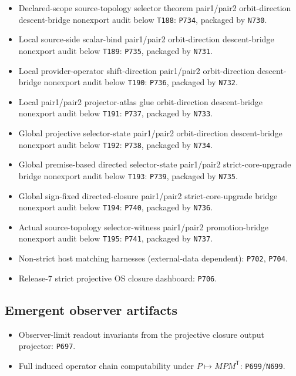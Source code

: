 \documentclass[11pt,a4paper]{article}
\begin{document}
\begin{itemize}
  \item Declared-scope source-topology selector theorem pair1/pair2 orbit-direction descent-bridge nonexport audit below \texttt{T188}: \texttt{P734}, packaged by \texttt{N730}.
  \item Local source-side scalar-bind pair1/pair2 orbit-direction descent-bridge nonexport audit below \texttt{T189}: \texttt{P735}, packaged by \texttt{N731}.
  \item Local provider-operator shift-direction pair1/pair2 orbit-direction descent-bridge nonexport audit below \texttt{T190}: \texttt{P736}, packaged by \texttt{N732}.
  \item Local pair1/pair2 projector-atlas glue orbit-direction descent-bridge nonexport audit below \texttt{T191}: \texttt{P737}, packaged by \texttt{N733}.
  \item Global projective selector-state pair1/pair2 orbit-direction descent-bridge nonexport audit below \texttt{T192}: \texttt{P738}, packaged by \texttt{N734}.
  \item Global premise-based directed selector-state pair1/pair2 strict-core-upgrade bridge nonexport audit below \texttt{T193}: \texttt{P739}, packaged by \texttt{N735}.
  \item Global sign-fixed directed-closure pair1/pair2 strict-core-upgrade bridge nonexport audit below \texttt{T194}: \texttt{P740}, packaged by \texttt{N736}.
  \item Actual source-topology selector-witness pair1/pair2 promotion-bridge nonexport audit below \texttt{T195}: \texttt{P741}, packaged by \texttt{N737}.
  \item Non-strict host matching harnesses (external-data dependent): \texttt{P702}, \texttt{P704}.
  \item Release-7 strict projective OS closure dashboard: \texttt{P706}.
\end{itemize}
\subsection{Emergent observer artifacts}

\begin{itemize}
  \item Observer-limit readout invariants from the projective closure output projector: \texttt{P697}.
  \item Full induced operator chain computability under $P\mapsto MPM^{\mathsf T}$: \texttt{P699}/\texttt{N699}.
\end{itemize}
\end{document}
